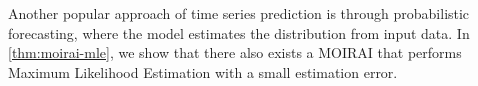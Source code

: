Another popular approach of time series prediction is through probabilistic forecasting, where the model estimates the distribution from input data.
In \cref{thm:moirai-mle}, we show that there also exists a MOIRAI that performs Maximum Likelihood Estimation with a small estimation error.







